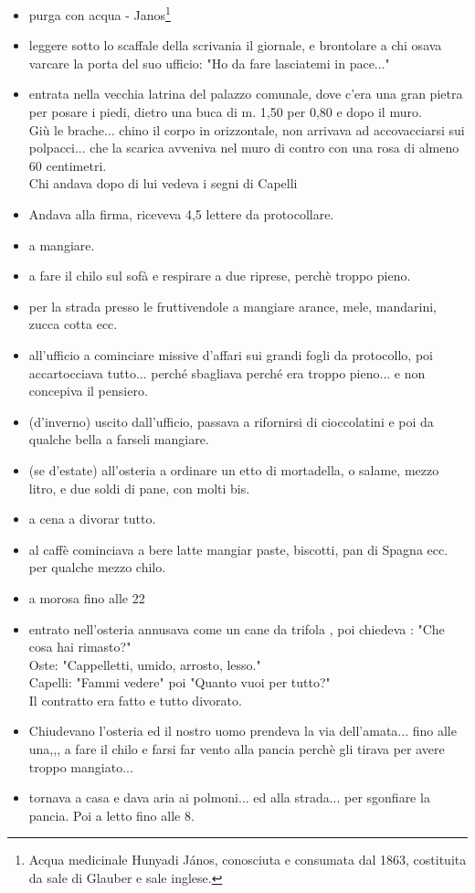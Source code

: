 \documentclass[10pt]{memoir} %
\begin{document}
\begin{itemize}
\item[9.00]purga con acqua - Janos\footnote{Acqua medicinale Hunyadi János, conosciuta e consumata dal 1863, costituita da sale di Glauber e sale inglese.}
\item[10.00]leggere sotto lo scaffale della scrivania il giornale, e brontolare a chi osava varcare la porta del suo ufficio: "Ho da fare lasciatemi in pace..."
\item[11.00]entrata nella vecchia latrina del palazzo comunale, dove c'era una gran pietra per posare i piedi, dietro una buca di m. 1,50 per 0,80 e dopo il muro.\\
Giù le brache... chino il corpo in orizzontale, non arrivava ad accovacciarsi sui polpacci... che la scarica avveniva nel muro di contro con una rosa di almeno 60 centimetri. \\
Chi andava dopo di lui vedeva i segni di Capelli
\item[11.30]Andava alla firma, riceveva 4,5 lettere da protocollare.
\item[12.00] a mangiare.
\item[13.00] a fare il chilo sul sofà e respirare a due riprese, perchè troppo pieno.
\item[13.30] per la strada presso le fruttivendole a mangiare arance, mele, mandarini, zucca cotta ecc.
\item[14.00] all'ufficio a cominciare missive d'affari sui grandi fogli da protocollo, poi accartocciava tutto... perché sbagliava perché era troppo pieno... e non concepiva il pensiero.
\item[17.00] (d'inverno) uscito dall'ufficio, passava a rifornirsi di cioccolatini e poi da qualche bella a farseli mangiare.
\item[18.00](se d'estate) all'osteria a ordinare un etto di mortadella, o salame, mezzo litro, e due soldi di pane, con molti bis.
\item[19 - 20] a cena a divorar tutto.
\item[20.30] al caffè cominciava a bere latte mangiar paste, biscotti, pan di Spagna ecc. per qualche mezzo chilo.
\item[21.30] a morosa fino alle 22
\item[22.00] entrato nell'osteria annusava come un cane da trifola , poi chiedeva : "Che cosa hai rimasto?"\\
Oste: "Cappelletti, umido, arrosto, lesso."\\
Capelli: "Fammi vedere" poi "Quanto vuoi per tutto?"	\\ Il contratto era fatto e tutto divorato.
\item[23.00] Chiudevano l'osteria ed il nostro uomo prendeva la via dell'amata... fino alle una,,, a fare il chilo e farsi far vento alla pancia perchè gli tirava per avere troppo mangiato...
\item[1.00] tornava a casa e dava aria ai polmoni... ed alla strada... per sgonfiare la pancia. Poi a letto fino alle 8.
\end{itemize}
\end{document}
